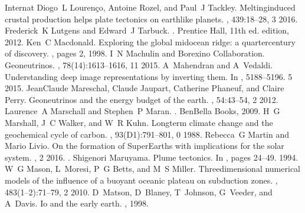 \documentclass[letterpaper,10pt,english]{jupyterBook}
\begin{document}
\begin{sphinxthebibliography}{Internat}
\sphinxAtStartPar
Diogo L Lourenço, Antoine Rozel, and Paul J Tackley. Melting\sphinxhyphen{}induced crustal production helps plate tectonics on earth\sphinxhyphen{}like planets. , 439:18–28, 3 2016.
\sphinxAtStartPar
Frederick K Lutgens and Edward J Tarbuck. . Prentice Hall, 11th ed. edition, 2012.
\sphinxAtStartPar
Ken C Macdonald. Exploring the global mid\sphinxhyphen{}ocean ridge: a quarter\sphinxhyphen{}century of discovery. , pages 2, 1998.
\sphinxAtStartPar
I N Machulin and Borexino Collaboration. Geoneutrinos. , 78(14):1613–1616, 11 2015.
\sphinxAtStartPar
A Mahendran and A Vedaldi. Understanding deep image representations by inverting them. In , 5188–5196. 5 2015.
\sphinxAtStartPar
Jean\sphinxhyphen{}Claude Mareschal, Claude Jaupart, Catherine Phaneuf, and Claire Perry. Geoneutrinos and the energy budget of the earth. , 54:43–54, 2 2012.
\sphinxAtStartPar
Laurence A Marschall and Stephen P Maran. . BenBella Books, 2009.
\sphinxAtStartPar
H G Marshall, J C Walker, and W R Kuhn. Long\sphinxhyphen{}term climate change and the geochemical cycle of carbon. , 93(D1):791–801, 0 1988.
\sphinxAtStartPar
Rebecca G Martin and Mario Livio. On the formation of Super\sphinxhyphen{}Earths with implications for the solar system. , 2 2016. .
\sphinxAtStartPar
Shigenori Maruyama. Plume tectonics. In , pages 24–49. 1994.
\sphinxAtStartPar
W G Mason, L Moresi, P G Betts, and M S Miller. Three\sphinxhyphen{}dimensional numerical models of the influence of a buoyant oceanic plateau on subduction zones. , 483(1–2):71–79, 2 2010.
\sphinxAtStartPar
D Matson, D Blaney, T Johnson, G Veeder, and A Davis. Io and the early earth. , 1998.

\end{sphinxthebibliography}
\end{document}
